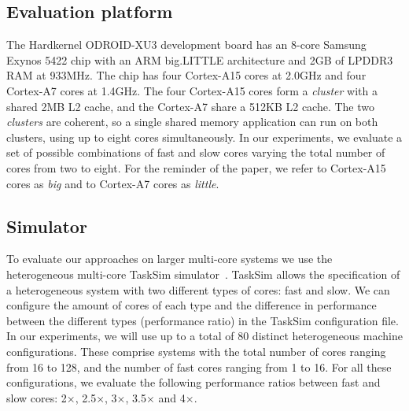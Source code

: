 \subsection{Evaluation platform}
\label{sec:platform}
The Hardkernel ODROID-XU3 development board has an 8-core Samsung Exynos 5422 chip with an ARM big.LITTLE architecture and 2GB of LPDDR3 RAM at 933MHz. The chip has four Cortex-A15 cores at 2.0GHz and four Cortex-A7 cores at 1.4GHz. The four Cortex-A15 cores form a \textit{cluster} with a shared 2MB L2 cache, and the Cortex-A7 share a 512KB L2 cache. The two \textit{clusters} are coherent, so a single shared memory application can run on both clusters, using up to eight cores simultaneously. In our experiments, we evaluate a set of possible combinations of fast and slow cores varying the total number of cores from two to eight. For the reminder of the paper, we refer to Cortex-A15 cores as \textit{big} and to Cortex-A7 cores as \textit{little}.

\subsection{Simulator}

To evaluate our approaches on larger multi-core systems we use the heterogeneous multi-core TaskSim simulator~\cite{AbstrLevels_TACO12}. 
TaskSim allows the specification of a heterogeneous system with two different types of cores: fast and slow. 
We can configure the amount of cores of each type and the difference in performance between the different types (performance ratio) in the TaskSim configuration file.
In our experiments, we will use up to a total of 80 distinct heterogeneous machine configurations.  
These comprise systems with the total number of cores ranging from 16 to 128, and the number of fast cores ranging from 1 to 16. 
For all these configurations, we evaluate the following performance ratios between fast and slow cores: 2$\times$, 2.5$\times$, 3$\times$, 3.5$\times$ and 4$\times$.

